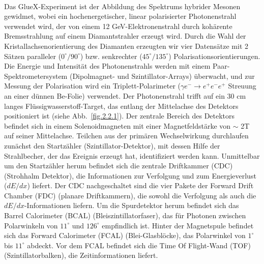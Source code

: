 ~\par Das GlueX-Experiment ist der Abbildung des Spektrums hybrider Mesonen gewidmet, wobei ein hochenergetischer, linear polarisierter Photonenstrahl verwendet wird, der von einem 12 GeV-Elektronenstrahl durch kohärente Bremsstrahlung auf einem Diamantstrahler erzeugt wird. Durch die Wahl der Kristallachsenorientierung des Diamanten erzeugten wir vier Datensätze mit 2 Sätzen paralleler ($0^{\circ}/90^{\circ}$) bzw. senkrechter ($45^{\circ}/135^{\circ}$) Polarisationsorientierungen. Die Energie und Intensität des Photonenstrahls werden mit einem Paar-Spektrometersystem (Dipolmagnet- und Szintillator-Arrays) überwacht, und zur Messung der Polarisation wird ein Triplett-Polarimeter ($\gamma e^{-} \rightarrow e^{+}e^{-}e^{+}$ Streuung an einer dünnen Be-Folie) verwendet. Der Photonenstrahl trifft auf ein 30 cm langes Flüssigwasserstoff-Target, das entlang der Mittelachse des Detektors positioniert ist (siehe Abb.~\ref{fig.2.2.1}). Der zentrale Bereich des Detektors befindet sich in einem Solenoidmagneten mit einer Magnetfeldstärke von $\sim$ 2T auf seiner Mittelachse. Teilchen aus der primären Wechselwirkung durchlaufen zunächst den Startzähler (Szintillator-Detektor), mit dessen Hilfe der Strahlbecher, der das Ereignis erzeugt hat, identifiziert werden kann. Unmittelbar um den Startzähler herum befindet sich die zentrale Driftkammer (CDC) (Strohhalm Detektor), die Informationen zur Verfolgung und zum Energieverlust ($dE/dx$) liefert. Der CDC nachgeschaltet sind die vier Pakete der Forward Drift Chamber (FDC) (planare Driftkammern), die sowohl die Verfolgung als auch die $dE/dx$-Informationen liefern. Um die Spurdetektor herum befindet sich das Barrel Calorimeter (BCAL) (Bleiszintillatorfaser), das für Photonen zwischen Polarwinkeln von $11^{\circ}$ und $126^{\circ}$ empfindlich ist. Hinter der Magnetspule befindet sich das Forward Calorimeter (FCAL) (Blei-Glasblöcke), das Polarwinkel von $1^{\circ}$ bis $11^{\circ}$ abdeckt. Vor dem FCAL befindet sich die Time Of Flight-Wand (TOF) (Szintillatorbalken), die Zeitinformationen liefert.
